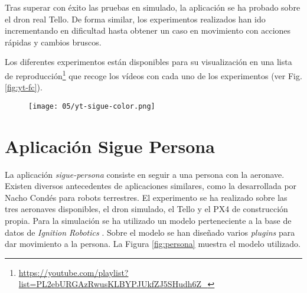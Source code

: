 \documentclass[../main.tex]{subfiles}
\begin{document}
Tras superar con éxito las pruebas en simulado, la aplicación se ha probado sobre el dron real Tello. De forma similar, los experimentos realizados han ido incrementando en dificultad hasta obtener un caso en movimiento con acciones rápidas y cambios bruscos.

Los diferentes experimentos están disponibles para su visualización en una lista de reproducción\footnote{\url{https://youtube.com/playlist?list=PL2ebURGAzRwusKLBYPJUkfZJ5SHudh6Z_}} que recoge los vídeos con cada uno de los experimentos (ver Fig. \ref{fig:yt-fc}).

\begin{figure}[!ht]
 	{\texttt{[image: 05/yt-sigue-color.png]}}
\end{figure}

\newpage

\section{Aplicación Sigue Persona} \label{section:aplic-pers}
La aplicación \emph{sigue-persona} consiste en seguir a una persona con la aeronave. Existen diversos antecedentes de aplicaciones similares, como la desarrollada por Nacho Condés \cite{tfm-nacho, condes2020embedded} para robots terrestres. El experimento se ha realizado sobre las tres aeronaves disponibles, el dron simulado, el Tello y el PX4 de construcción propia. Para la simulación se ha utilizado un modelo perteneciente a la base de datos de \emph{Ignition Robotics} \cite{IgnitionFuel-OpenRobotics-Standing-person}. Sobre el modelo se han diseñado varios \emph{plugins} para dar movimiento a la persona. La Figura \ref{fig:persona} muestra el modelo utilizado.

\begin{figure}[ht]
\end{figure}
\end{document}
